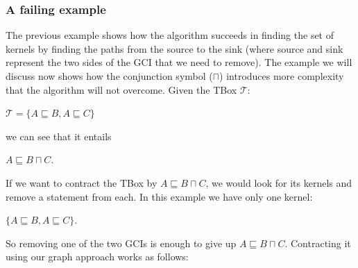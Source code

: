 \subsubsection{A failing example}
The previous example shows how the algorithm succeeds in finding the set of kernels by finding the paths from the source to the sink (where source and sink represent the two sides of the GCI that we need to remove). The example we will discuss now shows how the conjunction symbol ($\sqcap$) introduces more complexity that the algorithm will not overcome. Given the TBox $\mathcal{T}$:
\begin{center}
$\mathcal{T} = \lbrace A \sqsubseteq B, A \sqsubseteq C \rbrace$
\end{center}
we can see that it entails
\begin{center}
$A \sqsubseteq B \sqcap C$.
\end{center}
If we want to contract the TBox by $A \sqsubseteq B \sqcap C$, we would look for its kernels and remove a statement from each. In this example we have only one kernel:
\begin{center}
$\lbrace A \sqsubseteq B, A \sqsubseteq C \rbrace$.
\end{center}
So removing one of the two GCIs is enough to give up $A \sqsubseteq B \sqcap C$. Contracting it using our graph approach works as follows:

